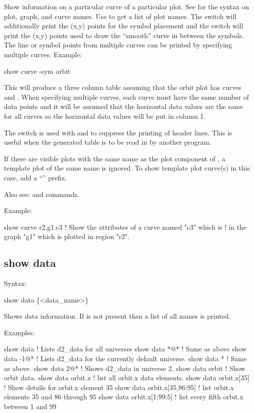 {{{{{{{{Show information on a particular curve of a particular plot. See  for the syntax on
plot, graph, and curve names.  Use  to get a list of plot names. The 
switch will additionally print the (x,y) points for the symbol placement and the  switch
will print the (x,y) points used to draw the ``smooth'' curve in between the symbols. The line or
symbol points from multiple curves can be printed by specifying multiple curves. Example:
\begin{example}
  show curve -sym orbit
\end{example}
This will produce a three column table assuming that the orbit plot has curves  and
. When specifying multiple curves, each curve must have the same number of data
points and it will be assumed that the horizontal data values are the same for all curves so the
horizontal data values will be put in column 1.

The  switch is used with  and  to suppress the printing of
header lines. This is useful when the generated table is to be read in by another program.

If there are visible plots with the same name as the plot component of , a template plot
of the same name is ignored. To show template plot curve(s) in this case, add a ``'' prefix.

Also see:  and  commands.

Example:
\begin{example}
  show curve r2.g1.c3     ! Show the attributes of a curve named "c3" which is 
                          !   in the graph "g1" which is plotted in region "r2".
\end{example}


\subsection{show data}
\label{s:show.data}

Syntax:
\begin{example}
  show data \{<data_name>\}
\end{example}

Shows data information. If  is not present then a list of all 
names is printed.

Examples:
\begin{example}
  show data                   ! Lists d2_data for all universes
  show data *@*               ! Same as above
  show data -1@*              ! Lists d2_data for the currently default universe.
  show data *                 ! Same as above.
  show data 2@*               ! Shows d2_data in universe 2.
  show data orbit             ! Show orbit data.
  show data orbit.x           ! list all orbit.x data elements.
  show data orbit.x[35]       ! Show details for orbit.x element 35
  show data orbit.x[35,86:95] ! list orbit.x elements 35 and 86 through 95
  show data orbit.x[1:99:5]   ! list every fifth orbit.x between 1 and 99  
\end{example}

}}}}}}}}
